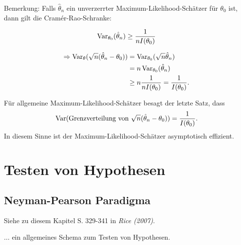 \documentclass{tstextbook}
\begin{document}
	\begin{remark}
		Bemerkung: Falls $ \hat{\theta}_n $ ein unverzerrter Maximum-Likelihood-Schätzer für $ \theta_0 $ ist, dann gilt die Cramér-Rao-Schranke: 
	    
	    \[
	    	\operatorname{Var}_{\theta_0}(\hat{\theta}_n) \ge \frac{1}{n I(\theta_0)}
	    \]
	    
		\[
		\begin{aligned}
			\Rightarrow \operatorname{Var}_{\theta}(\sqrt{n}(\hat{\theta}_n-\theta_0)) & = \operatorname{Var}_{\theta_0}(\sqrt{n}\hat{\theta}_n) \\
	        & = n\operatorname{Var}_{\theta_0}(\hat{\theta}_n) \\
	        & \ge n \frac{1}{n I(\theta_0)} = \frac{1}{I(\theta_0)} .
		\end{aligned}
		\] 
		
		Für allgemeine Maximum-Likelihood-Schätzer besagt der letzte Satz, dass 
		\[
		\operatorname{Var}(\text{Grenzverteilung von }\sqrt{n}(\hat{\theta}_n-\theta_0))=\frac{1}{I(\theta_0)}.
		\]
		In diesem Sinne ist der Maximum-Likelihood-Schätzer asymptotisch effizient.
		
	\end{remark}


\chapter{Testen von Hypothesen}

\section{Neyman-Pearson Paradigma}
	\begin{book}
	Siehe zu diesem Kapitel S. 329-341 in	\textit{Rice (2007)}.
\end{book}

$\ldots$ ein allgemeines Schema zum Testen von Hypothesen. 
\vspace{0.5cm}
\end{document}
